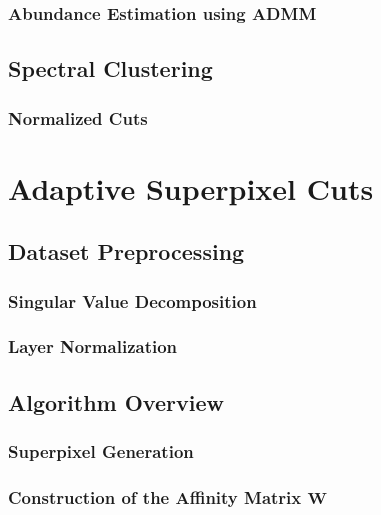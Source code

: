 \documentclass[10pt]{article}
\begin{document}
\subsubsection{Abundance Estimation using ADMM}\label{Block ADMM}

\clearpage
\subsection{Spectral Clustering} \label{Spectral Clustering}

\subsubsection{Normalized Cuts} \label{Normalized Cuts}

\clearpage
% 
% 
% 
% 
% 
\section{Adaptive Superpixel Cuts} \label{Algorithm Intro}

\subsection{Dataset Preprocessing} \label{Algorithm Preprocessing}
\subsubsection{Singular Value Decomposition} \label{SVD}
\subsubsection{Layer Normalization} \label{Normalization}

\clearpage
\subsection{Algorithm Overview} \label{Algorithm Overview}
\subsubsection{Superpixel Generation} \label{Algorithm Superpixels}
\subsubsection{Construction of the Affinity Matrix $\mathbf{W}$}\label{Algorithm Laplacian}
\end{document}
